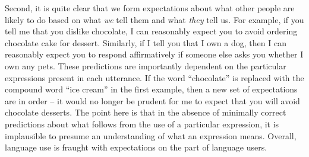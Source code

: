 Second, it is quite clear that we form expectations about what other people are likely to do based on what \textit{we} tell them and what \textit{they} tell us. For example, if you tell me that you dislike chocolate, I can reasonably expect you to avoid ordering chocolate cake for dessert. Similarly, if I tell you that I own a dog, then I can reasonably expect you to respond affirmatively if someone else asks you whether I own any pets. These predictions are importantly dependent on the particular expressions present in each utterance. If the word ``chocolate'' is replaced with the compound word ``ice cream'' in the first example, then a new set of expectations are in order -- it would no longer be prudent for me to expect that you will avoid chocolate desserts. The point here is that in the absence of minimally correct predictions about what follows from the use of a particular expression, it is implausible to presume an understanding of what an expression means. Overall, language use is fraught with expectations on the part of language users.
 
